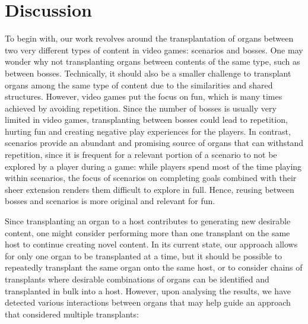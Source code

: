 \section{Discussion}
\label{sec:Discussion}


To begin with, our work revolves around the transplantation of organs between two very different types of content in video games: scenarios and bosses. One may wonder why not transplanting organs between contents of the same type, such as between bosses. Technically, it should also be a smaller challenge to transplant organs among the same type of content due to the similarities and shared structures. However, video games put the focus on fun, which is many times achieved by avoiding repetition. Since the number of bosses is usually very limited in video games, transplanting between bosses could lead to repetition, hurting fun and creating negative play experiences for the players. In contrast, scenarios provide an abundant and promising source of organs that can withstand repetition, since it is frequent for a relevant portion of a scenario to not be explored by a player during a game: while players spend most of the time playing within scenarios, the focus of scenarios on completing goals combined with their sheer extension renders them difficult to explore in full. Hence, reusing between bosses and scenarios is more original and relevant for fun. 

Since transplanting an organ to a host contributes to generating new desirable content, one might consider performing more than one transplant on the same host to continue creating novel content. In its current state, our approach allows for only one organ to be transplanted at a time, but it should be possible to repeatedly transplant the same organ onto the same host, or to consider chains of transplants where desirable combinations of organs can be identified and transplanted in bulk into a host. However, upon analysing the results, we have detected various interactions between organs that may help guide an approach that considered multiple transplants: 

